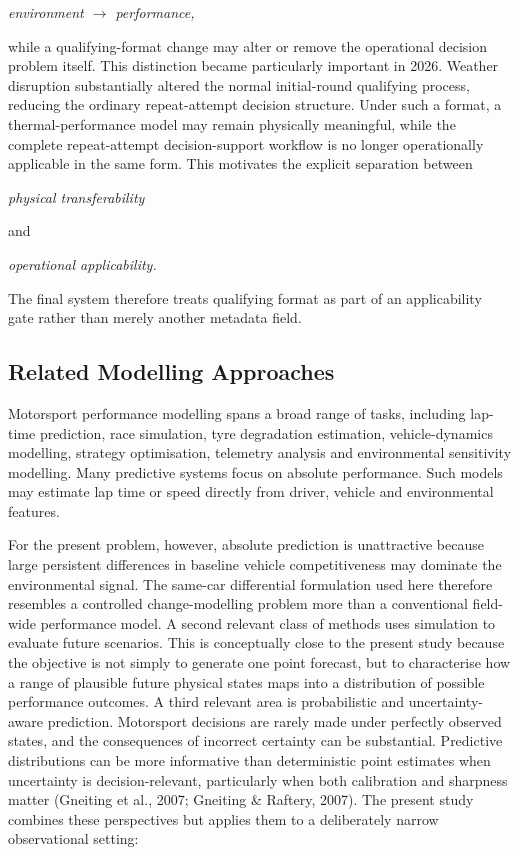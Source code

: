 \begin{center}\textit{environment \ensuremath{\rightarrow} performance,}\end{center}

while a qualifying-format change may alter or remove the operational decision problem itself. This distinction became particularly important in 2026. Weather disruption substantially altered the normal initial-round qualifying process, reducing the ordinary repeat-attempt decision structure. Under such a format, a thermal-performance model may remain physically meaningful, while the complete repeat-attempt decision-support workflow is no longer operationally applicable in the same form. This motivates the explicit separation between

\begin{center}\textit{physical transferability}\end{center}

and

\begin{center}\textit{operational applicability.}\end{center}

The final system therefore treats qualifying format as part of an applicability gate rather than merely another metadata field.

\subsection{Related Modelling Approaches}
Motorsport performance modelling spans a broad range of tasks, including lap-time prediction, race simulation, tyre degradation estimation, vehicle-dynamics modelling, strategy optimisation, telemetry analysis and environmental sensitivity modelling. Many predictive systems focus on absolute performance. Such models may estimate lap time or speed directly from driver, vehicle and environmental features.

For the present problem, however, absolute prediction is unattractive because large persistent differences in baseline vehicle competitiveness may dominate the environmental signal. The same-car differential formulation used here therefore resembles a controlled change-modelling problem more than a conventional field-wide performance model. A second relevant class of methods uses simulation to evaluate future scenarios. This is conceptually close to the present study because the objective is not simply to generate one point forecast, but to characterise how a range of plausible future physical states maps into a distribution of possible performance outcomes. A third relevant area is probabilistic and uncertainty-aware prediction. Motorsport decisions are rarely made under perfectly observed states, and the consequences of incorrect certainty can be substantial. Predictive distributions can be more informative than deterministic point estimates when uncertainty is decision-relevant, particularly when both calibration and sharpness matter (Gneiting et al., 2007; Gneiting \& Raftery, 2007). The present study combines these perspectives but applies them to a deliberately narrow observational setting:

